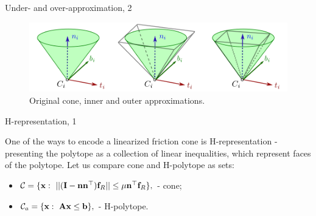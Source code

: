 \documentclass{beamer}
\begin{document}
\begin{frame}{Under- and over-approximation, 2}
	\begin{flushleft}
		
		
		
		\begin{figure}
			\centering
			\includegraphics[width=0.9\linewidth]{InnerOuter}
			\caption{Original cone, inner and outer approximations. }
			\label{fig:innerouter}
		\end{figure}
		
		
	\end{flushleft}
\end{frame}


\begin{frame}{H-representation, 1}
	\begin{flushleft}
		
		One of the ways to encode a linearized friction cone is H-representation - presenting the polytope as a collection of linear inequalities, which represent faces of the polytope. Let us compare cone and H-polytope as sets:
		
		\bigskip
		
		\begin{itemize}
			\item $\mathcal{C} = \{ \mathbf{x}: \ || (\mathbf{I} - \mathbf{n}\mathbf{n}^\top) \mathbf{f}_R ||
			\leq \mu \mathbf{n}^\top \mathbf{f}_R \},$ - cone;
			
			\item $\mathcal{C}_a = \{ \bo{x}: \ \bo{A}\bo{x} \leq \bo{b} \},$ - H-polytope.
		\end{itemize}
		
		
	\end{flushleft}
\end{frame}
\end{document}
